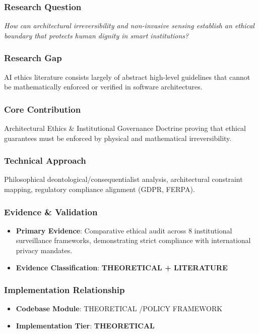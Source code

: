 \documentclass[11pt,letterpaper]{article}
\begin{document}
\subsubsection{Research Question}
\begin{tcolorbox}[colback=blue!3!white,colframe=blue!50!black,title=Primary Scientific Question]
\textit{How can architectural irreversibility and non-\allowbreak invasive sensing establish an ethical boundary that protects human dignity in smart institutions?}
\end{tcolorbox}

\subsubsection{Research Gap}
AI ethics literature consists largely of abstract high-\allowbreak level guidelines that cannot be mathematically enforced or verified in software architectures.

\subsubsection{Core Contribution}
Architectural Ethics \& Institutional Governance Doctrine proving that ethical guarantees must be enforced by physical and mathematical irreversibility.

\subsubsection{Technical Approach}
Philosophical deontological/\allowbreak consequentialist analysis, architectural constraint mapping, regulatory compliance alignment (GDPR, FERPA).

\subsubsection{Evidence \& Validation}
\begin{itemize}[leftmargin=*]
    \item \textbf{Primary Evidence}: Comparative ethical audit across 8 institutional surveillance frameworks, demonstrating strict compliance with international privacy mandates.
    \item \textbf{Evidence Classification}: \textbf{THEORETICAL + LITERATURE}
\end{itemize}

\subsubsection{Implementation Relationship}
\begin{itemize}[leftmargin=*]
    \item \raggedright \textbf{Codebase Module}: THEORETICAL /\allowbreak  POLICY FRAMEWORK
    \item \textbf{Implementation Tier}: \textbf{THEORETICAL}
\end{itemize}
\end{document}
